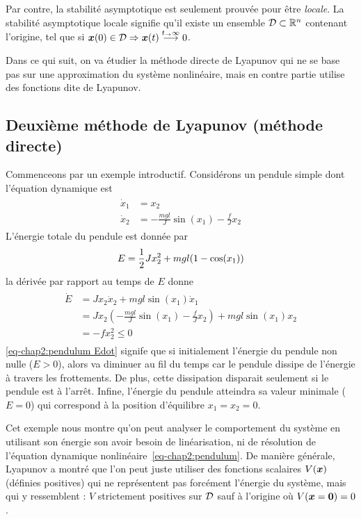 Par contre, la stabilité asymptotique est seulement prouvée pour être \emph{locale}. 
La stabilité asymptotique locale signifie qu'il existe un ensemble ${\cal D}\subset\mathbb{R}^n$ contenant l'origine, tel que si $\bm{x}(0)\in{\cal D}\Rightarrow \bm{x}(t)\overset{t_\rightarrow\infty}{\longrightarrow}0$. 

Dans ce qui suit, on va étudier la méthode directe de Lyapunov qui ne se base pas sur une approximation du système nonlinéaire, mais en contre partie utilise des fonctions dite de Lyapunov. 
\subsection{Deuxième méthode de Lyapunov (méthode directe)}\label{subsec:lyapunov direct method}
Commenceons par un exemple introductif. Considérons un pendule simple dont l'équation dynamique est 
\begin{align}\label{eq-chap2:pendulum}
	\begin{split}
		\dot{x}_1 &= x_2 \\
		\dot{x}_2 &= -\frac{mgl}{J}\sin(x_1)-\frac{f}{J}x_2
	\end{split}
\end{align}
L'énergie totale du pendule est donnée par 
\begin{equation}
	E = \frac{1}{2} Jx_2^2+mgl(1-\cos(x_1))
\end{equation}
la dérivée par rapport au temps de $E$ donne
\begin{align}\label{eq-chap2:pendulum Edot}
	\begin{split}
		\dot{E}&=Jx_2\dot{x}_2+mgl\sin(x_1)\dot{x}_1\\
		 	   &= Jx_2\left(-\frac{mgl}{J}\sin(x_1)-\frac{f}{J}x_2\right) + mgl\sin(x_1)x_2\\
		 	   &=-fx_2^2 \leq0
	\end{split}
\end{align} 
\cref{eq-chap2:pendulum Edot} signife que si initialement l'énergie du pendule non nulle ($E>0$), alors va diminuer au fil du temps car le pendule dissipe de l'énergie à travers les frottements. De plus, cette dissipation disparait seulement si le pendule est à l'arrêt. Infine, l'énergie du pendule atteindra sa valeur minimale ($E=0$) qui correspond à la position d'équilibre $x_1=x_2=0$. 

Cet exemple nous montre qu'on peut analyser le comportement du système en utilisant son énergie son avoir besoin de linéarisation, ni de résolution de l'équation dynamique nonlinéaire~\eqref{eq-chap2:pendulum}. De manière générale, Lyapunov a montré que l'on peut juste utiliser des fonctions scalaires $V(\bm{x})$ (définies positives) qui ne représentent pas forcément l'énergie du système, mais qui y ressemblent : $V$  strictement positives sur ${\cal D}$ sauf à l'origine où $V(\bm{x}=\mathbf{0})=0$. 

